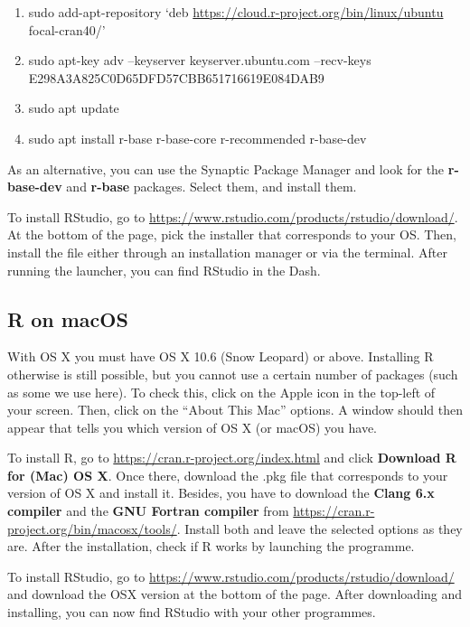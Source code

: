 \documentclass[
]{book}
\providecommand{\tightlist}{%
  \setlength{\itemsep}{0pt}\setlength{\parskip}{0pt}}
\begin{document}
\begin{enumerate}
\def\labelenumi{\arabic{enumi}.}
\tightlist
\item
  sudo add-apt-repository `deb \url{https://cloud.r-project.org/bin/linux/ubuntu} focal-cran40/'
\item
  sudo apt-key adv --keyserver keyserver.ubuntu.com --recv-keys E298A3A825C0D65DFD57CBB651716619E084DAB9
\item
  sudo apt update
\item
  sudo apt install r-base r-base-core r-recommended r-base-dev
\end{enumerate}

As an alternative, you can use the Synaptic Package Manager and look for the \textbf{r-base-dev} and \textbf{r-base} packages. Select them, and install them.

To install RStudio, go to \url{https://www.rstudio.com/products/rstudio/download/}. At the bottom of the page, pick the installer that corresponds to your OS. Then, install the file either through an installation manager or via the terminal. After running the launcher, you can find RStudio in the Dash.

\hypertarget{r-on-macos}{%
\subsection{R on macOS}\label{r-on-macos}}

With OS X you must have OS X 10.6 (Snow Leopard) or above. Installing R otherwise is still possible, but you cannot use a certain number of packages (such as some we use here). To check this, click on the Apple icon in the top-left of your screen. Then, click on the ``About This Mac'' options. A window should then appear that tells you which version of OS X (or macOS) you have.

To install R, go to \url{https://cran.r-project.org/index.html} and click \textbf{Download R for (Mac) OS X}. Once there, download the .pkg file that corresponds to your version of OS X and install it. Besides, you have to download the \textbf{Clang 6.x compiler} and the \textbf{GNU Fortran compiler} from \url{https://cran.r-project.org/bin/macosx/tools/}. Install both and leave the selected options as they are. After the installation, check if R works by launching the programme.

To install RStudio, go to \url{https://www.rstudio.com/products/rstudio/download/} and download the OSX version at the bottom of the page. After downloading and installing, you can now find RStudio with your other programmes.
\end{document}
